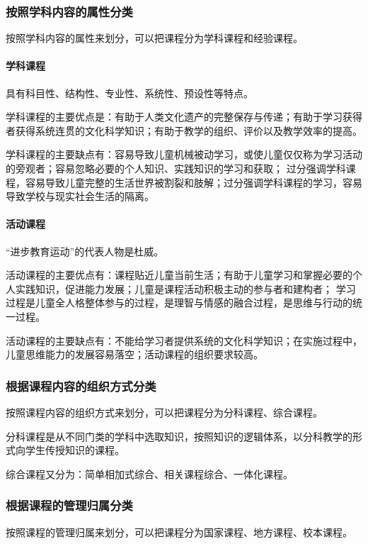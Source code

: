 \documentclass[b5paper,11pt]{article}
\begin{document}
\subsubsection{按照学科内容的属性分类}
按照学科内容的属性来划分，可以把课程分为\textcolor{ctp-red}{学科课程和经验课程}。

\paragraph{学科课程}具有\textcolor{ctp-lavender}{科目性、结构性、专业性、系统性、预设性}等特点。

学科课程的主要优点是：有助于人类文化遗产的完整保存与传递；有助于学习获得者获得系统连贯的文化科学知识；有助于教学的组织、评价以及教学效率的提高。

学科课程的主要缺点有：容易导致儿童机械被动学习，或使儿童仅仅称为学习活动的旁观者；容易忽略必要的个人知识、实践知识的学习和获取；
过分强调学科课程，容易导致儿童完整的生活世界被割裂和肢解；过分强调学科课程的学习，容易导致学校与现实社会生活的隔离。

\paragraph{活动课程} “进步教育运动”的代表人物是杜威。

活动课程的主要优点有：课程贴近儿童当前生活；有助于儿童学习和掌握必要的个人实践知识，促进能力发展；儿童是课程活动积极主动的参与者和建构者；
学习过程是儿童全人格整体参与的过程，是理智与情感的融合过程，是思维与行动的统一过程。

活动课程的主要缺点有：不能给学习者提供系统的文化科学知识；在实施过程中，儿童思维能力的发展容易落空；活动课程的组织要求较高。

\subsubsection{根据课程内容的组织方式分类}
按照课程内容的组织方式来划分，可以把课程分为\textcolor{ctp-red}{分科课程、综合课程}。

分科课程是\textcolor{ctp-red}{从不同门类的学科中选取知识，按照知识的逻辑体系，以分科教学的形式向学生传授知识的课程。}

综合课程又分为：\textcolor{ctp-red}{简单相加式综合、相关课程综合、一体化课程}。

\subsubsection{根据课程的管理归属分类}
按照课程的管理归属来划分，可以把课程分为\textcolor{ctp-red}{国家课程、地方课程、校本课程}。
\end{document}
